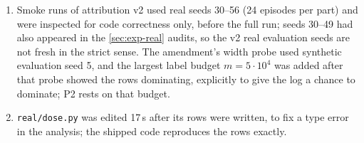 \begin{enumerate}
on non-vacuous probes were added after round-4 review and are not registered.
\item Smoke runs of attribution v2 used real seeds 30--56 (24 episodes per part) and were inspected for code
correctness only, before the full run; seeds 30--49 had also appeared in the \cref{sec:exp-real} audits, so
the v2 real evaluation seeds are not fresh in the strict sense. The amendment's width probe used synthetic
evaluation seed 5, and the largest label budget $m=5\cdot10^4$ was added after that probe showed the rows
dominating, explicitly to give the log a chance to dominate; P2 rests on that budget.
\item \texttt{real/dose.py} was edited 17\,s after its rows were written, to fix a type error in the analysis;
the shipped code reproduces the rows exactly.
\end{enumerate}
